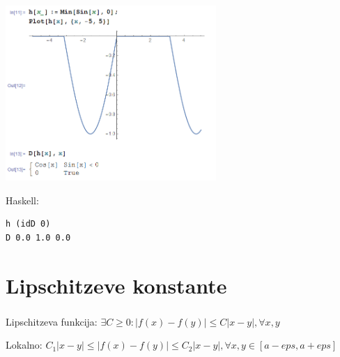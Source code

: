 \documentclass[9pt,table]{beamer}
\begin{document}
\begin{frame}[fragile]
\frametitle{}
\includegraphics[width=8cm]{graf4.png}

\pause
Haskell:
\begin{verbatim}
h (idD 0)
D 0.0 1.0 0.0
\end{verbatim}
\end{frame}


\section{Lipschitzeve konstante}

\begin{frame}
\frametitle{}\pause
Lipschitzeva funkcija: $\exists C\geq 0: |f(x)-f(y)|\leq C|x-y|, \forall x,y$ \pause

\vspace{10mm}
Lokalno: $C_1|x-y|\leq|f(x)-f(y)|\leq C_2|x-y|, \forall x,y \in [a-eps, a+eps]$
\end{frame}
\end{document}
